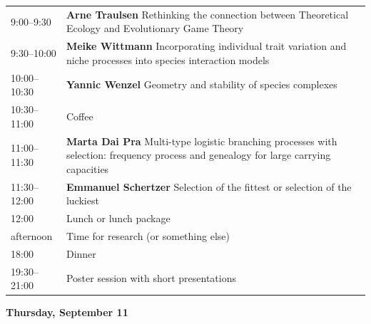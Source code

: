 \documentclass[12pt,a4paper]{article}
\begin{document}
\begin{tabular}{@{}l p{}@{}}
9:00--9:30 &\textbf{Arne Traulsen } Rethinking the connection between Theoretical Ecology and Evolutionary Game Theory \\
9:30--10:00 &\textbf{Meike Wittmann } Incorporating individual trait variation and niche processes into species interaction models \\
10:00--10:30 &\textbf{Yannic Wenzel } Geometry and stability of species complexes \\
10:30--11:00 & Coffee \\
11:00--11:30 &\textbf{Marta Dai Pra } Multi-type logistic branching processes with selection: frequency process and genealogy for large carrying capacities \\
11:30--12:00 &\textbf{Emmanuel Schertzer } Selection of the fittest or selection of the luckiest \\
12:00 & Lunch or lunch package \\
afternoon & Time for research (or something else) \\
18:00 & Dinner \\
19:30--21:00 & Poster session with short presentations \\
\end{tabular}

\newpage
\textbf{\Large Thursday, September 11}\medskip
\end{document}
